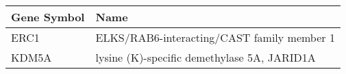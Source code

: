 \begin{tabular}{ll}
\toprule
Gene Symbol &                                        Name \\
\midrule
       ERC1 &  ELKS/RAB6-interacting/CAST family member 1 \\
      KDM5A & lysine (K)-specific demethylase 5A, JARID1A \\
\bottomrule
\end{tabular}
